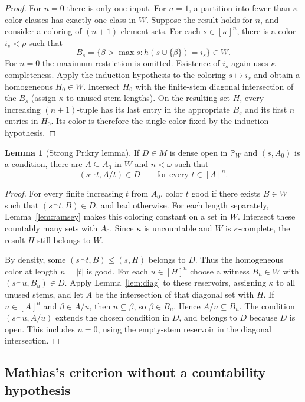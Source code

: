 \documentclass[11pt,letterpaper]{article}
\theoremstyle{definition}
\newtheorem{lemma}[definition]{Lemma}
\numberwithin{equation}{section}
\newcommand{\PP}{\mathbb P}
\newcommand{\concat}{\mathbin{{}^{\frown}}}
\begin{document}
\begin{proof}
For $n=0$ there is only one input. For $n=1$, a partition into fewer
than $\kappa$ color classes has exactly one class in $W$. Suppose the
result holds for $n$, and consider a coloring of $(n+1)$-element sets.
For each $s\in[\kappa]^n$, there is a color $i_s<\rho$ such that
\[
 B_s=\{\beta>\max s:h(s\cup\{\beta\})=i_s\}\in W.
\]
For $n=0$ the maximum restriction is omitted. Existence of $i_s$ again
uses $\kappa$-completeness. Apply the induction hypothesis to the
coloring $s\mapsto i_s$ and obtain a homogeneous $H_0\in W$.
Intersect $H_0$ with the finite-stem diagonal intersection of the $B_s$
(assign $\kappa$ to unused stem lengths). On the resulting set $H$,
every increasing $(n+1)$-tuple has its last entry in the appropriate
$B_s$ and its first $n$ entries in $H_0$. Its color is therefore the
single color fixed by the induction hypothesis.
\end{proof}

\begin{lemma}[Strong Prikry lemma]\label{lem:strong-prikry}
If $D\in M$ is dense open in $\PP_W$ and $(s,A_0)$ is a condition,
there are $A\subseteq A_0$ in $W$ and $n<\omega$ such that
\[
 (s\concat t,A/t)\in D\qquad\text{for every }t\in[A]^n.
\]
\end{lemma}

\begin{proof}
For every finite increasing $t$ from $A_0$, color $t$ good if there
exists $B\in W$ such that $(s\concat t,B)\in D$, and bad otherwise.
For each length separately, Lemma~\ref{lem:ramsey} makes this coloring
constant on a set in $W$. Intersect these countably many sets with
$A_0$. Since $\kappa$ is uncountable and $W$ is $\kappa$-complete,
the result $H$ still belongs to $W$.

By density, some $(s\concat t,B)\le(s,H)$ belongs to $D$. Thus the
homogeneous color at length $n=|t|$ is good. For each $u\in[H]^n$
choose a witness $B_u\in W$ with $(s\concat u,B_u)\in D$.
Apply Lemma~\ref{lem:diag} to these reservoirs, assigning $\kappa$ to
all unused stems, and let $A$ be the intersection of that diagonal set
with $H$. If $u\in[A]^n$ and $\beta\in A/u$, then
$u\subseteq\beta$, so $\beta\in B_u$. Hence $A/u\subseteq B_u$.
The condition $(s\concat u,A/u)$ extends the chosen condition in $D$,
and belongs to $D$ because $D$ is open. This includes $n=0$, using the
empty-stem reservoir in the diagonal intersection.
\end{proof}

\subsection{Mathias's criterion without a countability hypothesis}
\end{document}
